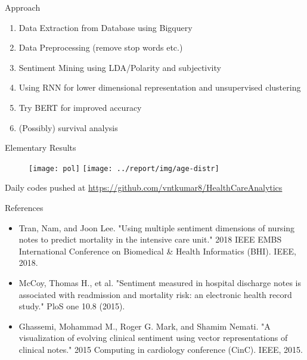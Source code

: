 \documentclass[11pt]{beamer}
\begin{document}
\begin{frame}{Approach}
\begin{enumerate}
	\item Data Extraction from Database using Bigquery
	\item Data Preprocessing (remove stop words etc.)
	\item Sentiment Mining using LDA/Polarity and subjectivity
	\item Using RNN for lower dimensional representation and unsupervised clustering
	\item Try BERT for improved accuracy 
	\item (Possibly) survival analysis 
\end{enumerate}
\end{frame}
\begin{frame}{Elementary Results}
	\begin{figure}
		\centering
		\texttt{[image: pol]}		\texttt{[image: ../report/img/age-distr]}
		\label{fig:pol}
	\end{figure}
Daily codes pushed at \url{https://github.com/vntkumar8/HealthCareAnalytics}
\end{frame}




\begin{frame}{References}
	\begin{itemize}
		\item Tran, Nam, and Joon Lee. "Using multiple sentiment dimensions of nursing notes to predict mortality in the intensive care unit." 2018 IEEE EMBS International Conference on Biomedical \& Health Informatics (BHI). IEEE, 2018.
		\item McCoy, Thomas H., et al. "Sentiment measured in hospital discharge notes is associated with readmission and mortality risk: an electronic health record study." PloS one 10.8 (2015).
		\item Ghassemi, Mohammad M., Roger G. Mark, and Shamim Nemati. "A visualization of evolving clinical sentiment using vector representations of clinical notes." 2015 Computing in cardiology conference (CinC). IEEE, 2015.
		
	\end{itemize}
\end{frame}
\end{document}
